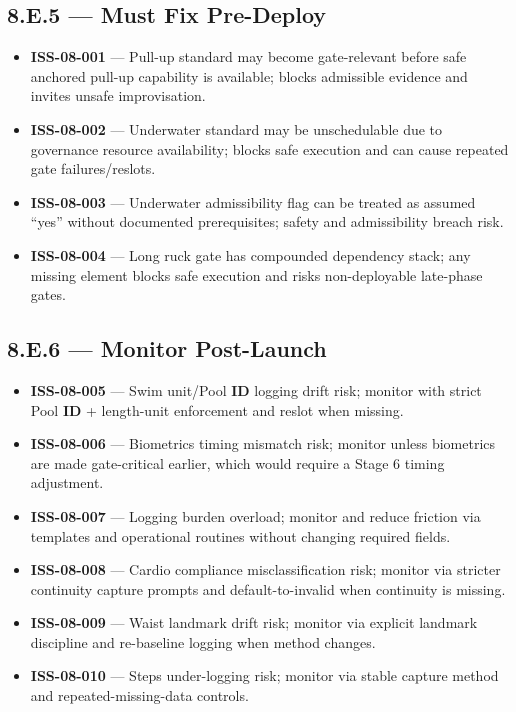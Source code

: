 \documentclass[10pt]{article}
\begin{document}
\subsection*{8.E.5 — Must Fix Pre-Deploy}
{}

\begin{itemize}
\item \textbf{ISS-08-001} — Pull-up standard may become gate-relevant before safe anchored pull-up capability is available; blocks admissible evidence and invites unsafe improvisation.
\item \textbf{ISS-08-002} — Underwater standard may be unschedulable due to governance resource availability; blocks safe execution and can cause repeated gate failures/reslots.
\item \textbf{ISS-08-003} — Underwater admissibility flag can be treated as assumed “yes” without documented prerequisites; safety and admissibility breach risk.
\item \textbf{ISS-08-004} — Long ruck gate has compounded dependency stack; any missing element blocks safe execution and risks non-deployable late-phase gates.
\end{itemize}

\subsection*{8.E.6 — Monitor Post-Launch}
{}

\begin{itemize}
\item \textbf{ISS-08-005} — Swim unit/Pool \textbf{ID} logging drift risk; monitor with strict Pool \textbf{ID} + length-unit enforcement and reslot when missing.
\item \textbf{ISS-08-006} — Biometrics timing mismatch risk; monitor unless biometrics are made gate-critical earlier, which would require a Stage 6 timing adjustment.
\item \textbf{ISS-08-007} — Logging burden overload; monitor and reduce friction via templates and operational routines without changing required fields.
\item \textbf{ISS-08-008} — Cardio compliance misclassification risk; monitor via stricter continuity capture prompts and default-to-invalid when continuity is missing.
\item \textbf{ISS-08-009} — Waist landmark drift risk; monitor via explicit landmark discipline and re-baseline logging when method changes.
\item \textbf{ISS-08-010} — Steps under-logging risk; monitor via stable capture method and repeated-missing-data controls.
\end{itemize}
\end{document}
